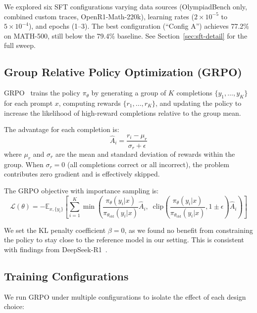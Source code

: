 \documentclass[11pt,a4paper]{article}
\begin{document}
We explored six SFT configurations varying data sources (OlympiadBench only, combined custom traces, OpenR1-Math-220k), learning rates ($2\times10^{-5}$ to $5\times10^{-4}$), and epochs (1--3). The best configuration (``Config A'') achieves 77.2\% on MATH-500, still below the 79.4\% baseline. See Section~\ref{sec:sft-detail} for the full sweep.

\subsection{Group Relative Policy Optimization (GRPO)}
\label{sec:grpo-method}

GRPO~\citep{shao2024deepseekmath} trains the policy $\pi_\theta$ by generating a group of $K$ completions $\{y_1, \ldots, y_K\}$ for each prompt $x$, computing rewards $\{r_1, \ldots, r_K\}$, and updating the policy to increase the likelihood of high-reward completions relative to the group mean.

The advantage for each completion is:
\begin{equation}
    \hat{A}_i = \frac{r_i - \mu_r}{\sigma_r + \epsilon}
\end{equation}
where $\mu_r$ and $\sigma_r$ are the mean and standard deviation of rewards within the group. When $\sigma_r = 0$ (all completions correct or all incorrect), the problem contributes zero gradient and is effectively skipped.

The GRPO objective with importance sampling is:
\begin{equation}
    \mathcal{L}(\theta) = -\mathbb{E}_{x, \{y_i\}} \left[ \sum_{i=1}^{K} \min\left( \frac{\pi_\theta(y_i|x)}{\pi_{\theta_{\text{old}}}(y_i|x)} \hat{A}_i, \;\; \text{clip}\left(\frac{\pi_\theta(y_i|x)}{\pi_{\theta_{\text{old}}}(y_i|x)}, 1\pm\epsilon\right) \hat{A}_i \right) \right]
\end{equation}

We set the KL penalty coefficient $\beta = 0$, as we found no benefit from constraining the policy to stay close to the reference model in our setting. This is consistent with findings from DeepSeek-R1~\citep{deepseek2025r1}.

\subsection{Training Configurations}

We run GRPO under multiple configurations to isolate the effect of each design choice:
\end{document}
